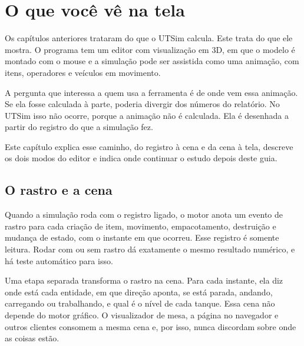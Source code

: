 \chapter{O que você vê na tela}
\label{cap-tela}


Os capítulos anteriores trataram do que o UTSim calcula. Este trata do que ele mostra. O programa tem um editor com visualização em 3D, em que o modelo é montado com o mouse e a simulação pode ser assistida como uma animação, com itens, operadores e veículos em movimento.

A pergunta que interessa a quem usa a ferramenta é de onde vem essa animação. Se ela fosse calculada à parte, poderia divergir dos números do relatório. No UTSim isso não ocorre, porque a animação não é calculada. Ela é desenhada a partir do registro do que a simulação fez.

Este capítulo explica esse caminho, do registro à cena e da cena à tela, descreve os dois modos do editor e indica onde continuar o estudo depois deste guia.

\section{O rastro e a cena}

Quando a simulação roda com o registro ligado, o motor anota um evento de rastro para cada criação de item, movimento, empacotamento, destruição e mudança de estado, com o instante em que ocorreu. Esse registro é somente leitura. Rodar com ou sem rastro dá exatamente o mesmo resultado numérico, e há teste automático para isso.

Uma etapa separada transforma o rastro na cena. Para cada instante, ela diz onde está cada entidade, em que direção aponta, se está parada, andando, carregando ou trabalhando, e qual é o nível de cada tanque. Essa cena não depende do motor gráfico. O visualizador de mesa, a página no navegador e outros clientes consomem a mesma cena e, por isso, nunca discordam sobre onde as coisas estão.

